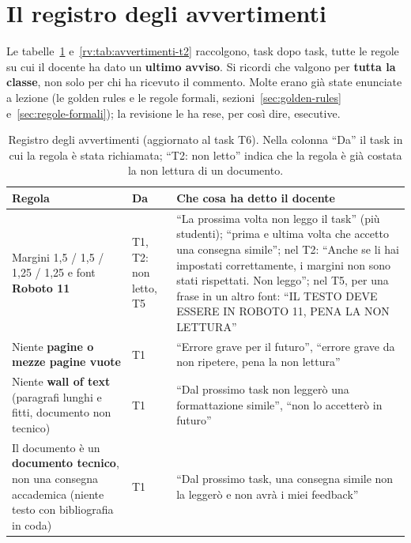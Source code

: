 \section{Il registro degli avvertimenti}
\label{rv:sec:avvertimenti}

Le tabelle~\ref{rv:tab:avvertimenti} e~\ref{rv:tab:avvertimenti-t2}
raccolgono, task dopo task, tutte le regole su cui il docente ha dato un
\textbf{ultimo avviso}. Si ricordi che
valgono per \textbf{tutta la classe}, non solo per chi ha ricevuto il
commento. Molte erano già state enunciate a lezione (le golden rules e le
regole formali, sezioni~\ref{sec:golden-rules} e~\ref{sec:regole-formali});
la revisione le ha rese, per così dire, esecutive.

\begin{table}[htbp]
  \centering
  \caption{Registro degli avvertimenti (aggiornato al task T6). Nella colonna
  ``Da'' il task in cui la regola è stata richiamata; ``T2: non letto'' indica
  che la regola è già costata la non lettura di un documento.}
  \label{rv:tab:avvertimenti}
  \small
  \begin{tabular}{@{}p{5.1cm}p{1.1cm}p{5.6cm}@{}}
    \toprule
    \textbf{Regola} & \textbf{Da} & \textbf{Che cosa ha detto il docente} \\
    \midrule
    Margini 1,5 / 1,5 / 1,25 / 1,25 e font \textbf{Roboto 11} &
      T1, T2: non letto, T5 & ``La prossima volta non leggo il task'' (più
      studenti); ``prima e ultima volta che accetto una consegna simile'';
      nel T2: ``Anche se li hai impostati correttamente, i margini non sono
      stati rispettati. Non leggo''; nel T5, per una frase in un altro font:
      ``IL TESTO DEVE ESSERE IN ROBOTO 11, PENA LA NON LETTURA'' \\
    \addlinespace
    Niente \textbf{pagine o mezze pagine vuote} &
      T1 & ``Errore grave per il futuro'', ``errore grave da non ripetere,
      pena la non lettura'' \\
    \addlinespace
    Niente \textbf{wall of text} (paragrafi lunghi e fitti, documento non
    tecnico) &
      T1 & ``Dal prossimo task non leggerò una formattazione simile'',
      ``non lo accetterò in futuro'' \\
    \addlinespace
    Il documento è un \textbf{documento tecnico}, non una consegna
    accademica (niente testo con bibliografia in coda) &
      T1 & ``Dal prossimo task, una consegna simile non la leggerò e non
      avrà i miei feedback'' \\

\end{tabular}
\end{table}
